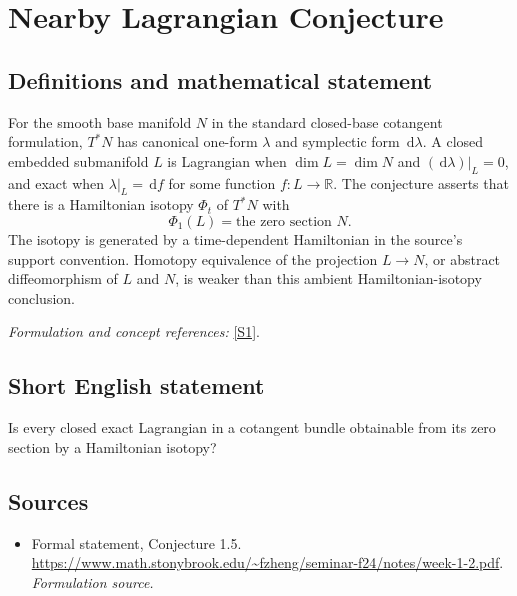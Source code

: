 \documentclass[11pt]{article}
\begin{document}
\section*{\texorpdfstring{Nearby Lagrangian Conjecture}{Nearby Lagrangian Conjecture}}\label{270}
\subsection{Definitions and mathematical statement}
For the smooth base manifold $N$ in the standard closed-base cotangent formulation, $T^*N$ has canonical one-form $\lambda$ and symplectic form ${\,\mathrm{d}}\lambda$. A closed embedded submanifold $L$ is Lagrangian when $\dim L=\dim N$ and $({\,\mathrm{d}}\lambda)|_L=0$, and exact when $\lambda|_L={\,\mathrm{d}} f$ for some function $f:L\to{\mathbb{R}}$. The conjecture asserts that there is a Hamiltonian isotopy $\Phi_t$ of $T^*N$ with
\[
 \Phi_1(L)=\text{the zero section }N.
\]
The isotopy is generated by a time-dependent Hamiltonian in the source's support convention. Homotopy equivalence of the projection $L\to N$, or abstract diffeomorphism of $L$ and $N$, is weaker than this ambient Hamiltonian-isotopy conclusion.
\par\smallskip\textit{Formulation and concept references:} \href{https://www.math.stonybrook.edu/~fzheng/seminar-f24/notes/week-1-2.pdf}{[S1]}.

\subsection{Short English statement}
Is every closed exact Lagrangian in a cotangent bundle obtainable from its zero section by a Hamiltonian isotopy?
\subsection{Sources}
\begin{itemize}
\item[S1]Formal statement, Conjecture 1.5.
\url{https://www.math.stonybrook.edu/~fzheng/seminar-f24/notes/week-1-2.pdf}.
\textit{Formulation source.}
\end{itemize}
\end{document}
